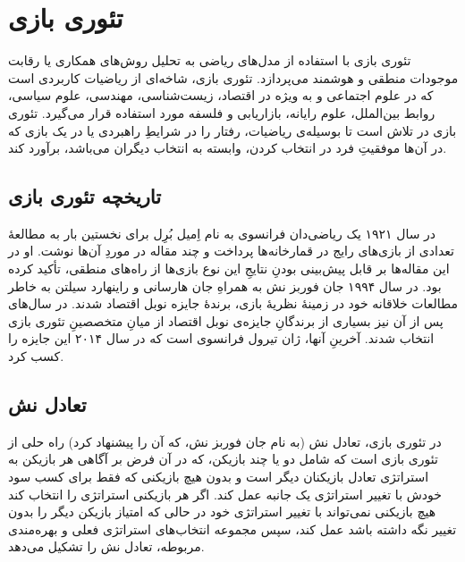 \section{تئوری بازی}
تئوری بازی با استفاده از مدل‌های ریاضی به تحلیل روش‌های همکاری یا رقابت موجودات منطقی و هوشمند می‌پردازد. تئوری بازی، شاخه‌ای از ریاضیات کاربردی است که در علوم اجتماعی و به ویژه در اقتصاد، زیست‌شناسی، مهندسی، علوم سیاسی، روابط بین‌الملل، علوم رایانه، بازاریابی و فلسفه مورد استفاده قرار می‌گیرد. تئوری بازی در تلاش است تا بوسیله‌ی ریاضیات، رفتار را در شرایطِ راهبردی یا در یک بازی که در آن‌ها موفقیتِ فرد در انتخاب کردن، وابسته به انتخاب دیگران می‌باشد، برآورد کند.
\subsection{تاریخچه تئوری بازی}
در سال ۱۹۲۱ یک ریاضی‌دان فرانسوی به نام اِمیل بُرِل برای نخستین بار به مطالعهٔ تعدادی از بازی‌های رایج در قمارخانه‌ها پرداخت و چند مقاله در موردِ آن‌ها نوشت. او در این مقاله‌ها بر قابل پیش‌بینی بودنِ نتایجِ این نوع بازی‌ها از راه‌های منطقی، تأکید کرده بود. در سال ۱۹۹۴ جان فوربز نش به همراهِ جان هارسانی و راینهارد سیلتن به خاطر مطالعات خلاقانه خود در زمینهٔ نظریهٔ بازی، برندهٔ جایزه نوبل اقتصاد شدند. در سال‌های پس از آن نیز بسیاری از برندگانِ جایزه‌ی نوبل اقتصاد از میانِ متخصصینِ تئوری بازی انتخاب شدند. آخرینِ آنها، ژان تیرول فرانسوی است که در سال ۲۰۱۴ این جایزه را کسب کرد.
\subsection{تعادل نش}
در تئوری بازی، تعادل نش (به نام جان فوربز نش، که آن را پیشنهاد کرد) راه حلی از تئوری بازی است که شامل دو یا چند بازیکن، که در آن فرض بر آگاهی هر بازیکن به استراتژی تعادل بازیکنان دیگر است و بدون هیچ بازیکنی که فقط برای کسب سود خودش با تغییر استراتژی یک جانبه عمل کند. اگر هر بازیکنی استراتژی را انتخاب کند هیچ بازیکنی نمی‌تواند با تغییر استراتژی خود در حالی که امتیاز بازیکن دیگر را بدون تغییر نگه داشته باشد عمل کند، سپس مجموعه انتخاب‌های استراتژی فعلی و بهره‌مندی مربوطه، تعادل نش را تشکیل می‌دهد.



